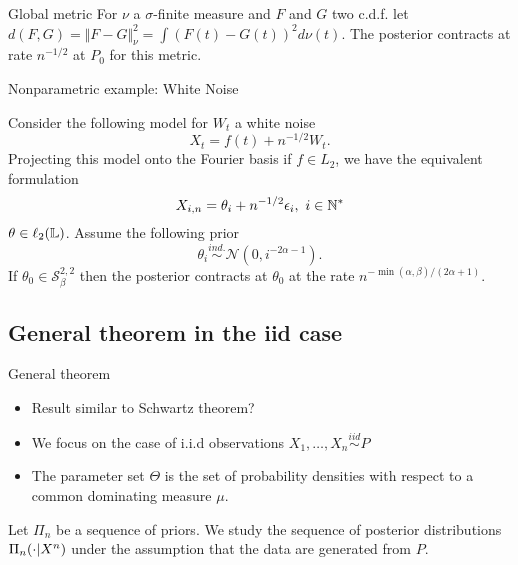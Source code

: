 \begin{block}{Global metric}
For $\nu$ a $\sigma$-finite measure and $F$ and $G$ two c.d.f. let $d(F,G) = \Vert F-G\Vert_\nu^2 = \int (F(t) - G(t))^2 d\nu(t)$. The posterior contracts at rate $n^{-1/2}$ at $P_0$ for this metric. 
\end{block}








{Nonparametric example: White Noise}

Consider the following model for $W_t$ a white noise
$$
X_t = f(t) + n^{-1/2}W_t.
$$
Projecting this model onto the Fourier basis if $f\in L_2$, we have the equivalent formulation
$$
X_{i,n} = \theta_i + n^{-1/2} \epsilon_i,~ i \in \mathbb{N}^* 
$$
$\theta \in \ell_2(\mathbb{L})$. Assume the following prior 
$$
\theta_i \overset{ind.}{\sim} \mathcal{N}(0, i^{-2\alpha - 1}).  
$$ 
If $\theta_0 \in \mathcal{S}_\beta^{2,2}$ then the posterior contracts at $\theta_0$ at the rate $n^{-\min(\alpha,\beta)/(2\alpha + 1)}$. 




\subsection[iid case]{General theorem in the iid case}





{General theorem}

\begin{itemize}
\item Result similar to Schwartz theorem? 
\item We focus on the case of i.i.d observations $X_1, \dots, X_n \overset{iid}{\sim} P$ 
\item The parameter set $\Theta$ is the set of probability densities with respect to a common dominating measure $\mu$. 
\end{itemize}
 

Let $\Pi_n$ be a sequence of priors. We study the sequence of posterior distributions $\Pi_n(\cdot|X^n)$ under the assumption that the data are generated from $P$. 








